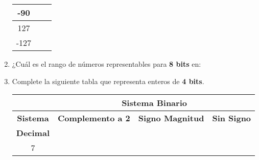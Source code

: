 \documentclass[12pt]{article}
\begin{document}
\begin{enumerate}
\begin{center}
\begin{tabular}[t]{|c|c|c|}
        \hline

            -90&&\\

        \hline

            127&&\\

        \hline

            -127&&\\

        \hline

        \end{tabular}

    \end{center}

    \item ¿Cuál es el rango de números representables para \textbf{8 bits} en:


    \item Complete la siguiente tabla que representa enteros de \textbf{4
        bits}.

        \begin{center}

            \begin{tabular}[t]{|c|c|c|c|}

            \cline{2-4}

            \multicolumn{1}{c}{}&\multicolumn{3}{|c|}{\textbf{Sistema Binario}}\\

            \hline

                \textbf{Sistema} & \textbf{Complemento a 2}& \textbf{Signo
                Magnitud} & \textbf{Sin Signo}\\

                \textbf{Decimal} & ~ & ~ &\\

            \hline

                7 & \hspace{9em}~&\hspace{9em}~&\hspace{9em}~\\


\end{tabular}
\end{center}
\end{enumerate}
\end{document}
